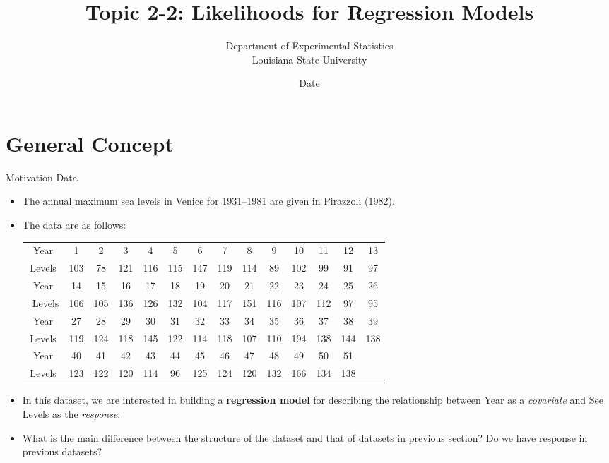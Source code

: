 \documentclass{beamer}
\title[]{Topic 2-2: Likelihoods for Regression Models}
\author{Department of Experimental Statistics \\
Louisiana State University}
\institute{}
\date{Date}
\begin{document}
\begin{frame}
  \titlepage
\end{frame}


\section{General Concept}



\begin{frame}{Motivation Data}
        \begin{itemize}
            \item The annual maximum sea levels in Venice for 1931–1981 are given in Pirazzoli (1982).
            \item The data are as follows:
\begin{table}
\hspace{-1.75 cm}
\begin{tiny}
\centering
\begin{tabular}{|c|ccccccccccccc|}
\hline
Year & 1 & 2 & 3 & 4 & 5 & 6 & 7 & 8 & 9 & 10 & 11 & 12 &  13 \\
Levels & 103 & 78 & 121 & 116 & 115 & 147 & 119 & 114 & 89 & 102 & 99 & 91 & 97 \\\hline
Year & 14 & 15 & 16 & 17 & 18 & 19 & 20 & 21 & 22 & 23 & 24 & 25 & 26 \\\
Levels & 106 & 105 & 136 & 126 & 132 & 104 & 117 & 151 & 116 & 107 & 112 & 97 & 95 \\\hline
Year & 27 & 28 & 29 & 30 & 31 & 32 & 33 & 34 & 35 & 36 & 37 & 38 & 39  \\
Levels & 119 & 124 & 118 & 145 & 122 & 114 & 118 & 107 & 110 & 194 & 138 & 144 & 138  \\\hline
Year & 40 & 41 & 42 & 43 & 44 & 45 & 46 & 47 & 48 & 49 & 50 & 51 & \\
Levels & 123 & 122 & 120 & 114 & 96 & 125 & 124 & 120 & 132 & 166 & 134 & 138 & \\\hline
\end{tabular}
\end{tiny}
\end{table}
\item In this dataset, we are interested in building a {\bf regression model} for describing the relationship between Year as a {\it covariate} and See Levels as the {\it response}.
\item What is the main difference between the structure of the dataset and that of datasets in previous section? Do we have response in previous datasets?
        \end{itemize}
    \end{frame}
    
\end{document}
